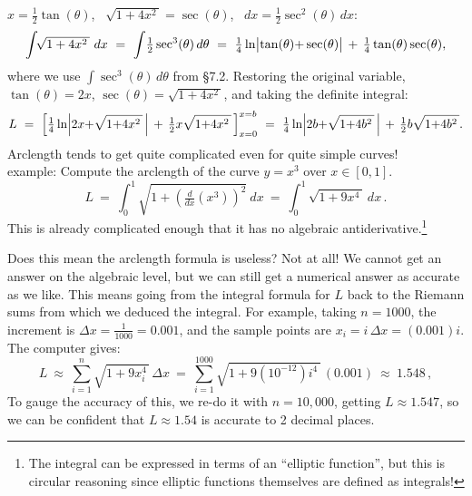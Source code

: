 \documentclass[11pt]{article}
\newcommand{\ts}{\textstyle}
\begin{document}
$x = \frac12\tan(\theta)$, \ $\sqrt{1+4x^2\,} = \sec(\theta)$, \ $dx = \frac12\sec^2(\theta)\,dx$:
$$
\int\!\! {\ts \sqrt{1+4x^2\,}}\ dx
\ =\
\int\! \tfrac12\sec^3(\theta)\,d\theta
\ =\
\tfrac14
\ln\!\left|\vphantom{A^2}\!\tan(\theta){+}\sec(\theta)\right| 
\,+\,\tfrac14\tan(\theta)\sec(\theta),
$$
where we use $\int\!\sec^3(\theta)\,d\theta$ from \S7.2.
Restoring the original variable, $\tan(\theta)=2x$, $\sec(\theta)=\sqrt{1{+}4x^2\,}$,
and taking the definite integral:
$$
L
\ =\
\left[
\tfrac14\ln\!\left|\vphantom{A^2} 2x{+}\sqrt{1{+}4x^2\,}\,\right| 
\,+\,\tfrac12x\sqrt{1{+}4x^2\,}\,
\right]_{x=0}^{x=b}
\ =\
\tfrac14\ln\!\left|\vphantom{A^2} 2b{+}\sqrt{1{+}4b^2\,}\,\right| 
\,+\,\tfrac12b\sqrt{1{+}4b^2\,}.
$$
Arclength tends to get quite complicated even for quite simple curves!
\\[1em]
{\sc example:} Compute the arclength of the curve $y=x^3$ over  $x\in[0,1]$.
$$
L 
\ =\
\int_0^1\!\!\! {\ts \sqrt{1+(\tfrac{d}{dx}(x^3))^2}}\ dx
\ =\ 
\int_0^1\!\!\! {\ts \sqrt{1+9x^4\,}}\ dx\,.
$$
This is already complicated enough that it has no algebraic antiderivative.\footnote{
The integral can be expressed in terms of an ``elliptic function'', but this is circular reasoning
since elliptic functions themselves are defined as integrals!}

Does this mean the arclength formula is useless? Not at all! We cannot get an answer
on the algebraic level, but we can still get a numerical answer as accurate as we like.
This means going from the integral formula for $L$ back to the Riemann sums from which we deduced the integral.  For example, taking $n=1000$, the increment is $\Delta x=\frac1{1000}=0.001$, and the sample points are $x_i=i\,\Delta x = (0.001)i$.
The computer gives:
$$
L
\ \approx\ 
\sum_{i=1}^{n} \sqrt{1+9x_i^4\,}\, \Delta x
\ =\
\sum_{i=1}^{1000} \sqrt{1+9(10^{-12})i^4\,}\, (0.001)
\ \approx\ 1.548\,,
$$
To gauge the accuracy of this, we re-do it with $n=10,000$, getting $L \approx 1.547$,
so we can be confident that $L \approx 1.54$ is accurate to 2 decimal places.
\end{document}
